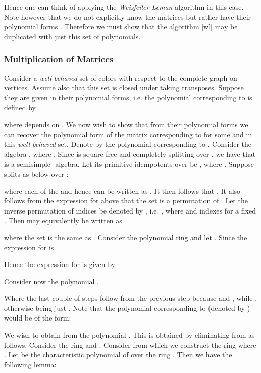 	Hence one can think of applying the  \emph{Weisfeiler-Leman} algorithm in this case. Note however that we do not explicitly know the matrices  but rather have their polynomial forms .
	Therefore we must show that the algorithm \ref{wl} may be duplicated with just this set of polynomials.

	\subsubsection{Multiplication of Matrices}
	Consider a \emph{well behaved} set of colors  with respect to the complete graph on  vertices. Assume also that this set is closed under taking transposes.	
	Suppose they are given in their polynomial forms, i.e. the polynomial corresponding to  is 
	defined by 

	


        where  depends on . We now wish to show that from their polynomial forms we can recover the polynomial form of the matrix corresponding to  for some  and  in this \emph{well behaved} set. 
	Denote by  the 
	polynomial corresponding to . Consider the algebra , where . Since  is square-free and completely
	splitting over , we have that  is a semisimple -algebra. Let its primitive idempotents over  be , where . Suppose
	 splits as below over :
	
	


	where each of the  and hence can be written as . It then follows that . It also follows from the expression 
	for  above that the set  is a permutation of . Let the inverse permutation of indices be denoted by 
	, i.e. , where  and  indexes  for a fixed . Then  may equivalently be written as 

	

	where the set  is the same as  . Consider the polynomial ring  and let . Since the expression for  is

	

	Hence the expression for  is given by 

	

	Consider now the polynomial .

			        


	Where the last couple of steps follow from the previous step because  and , while , otherwise  being just . Note that the polynomial
	corresponding to  (denoted by ) would be of the form:

	
 

	We wish to obtain  from the polynomial . This is obtained by eliminating  from  as follows. Consider the ring  and . Consider  from which we construct the ring  where .
	Let  be the characteristic polynomial of  over the ring . Then we have the following lemma:

